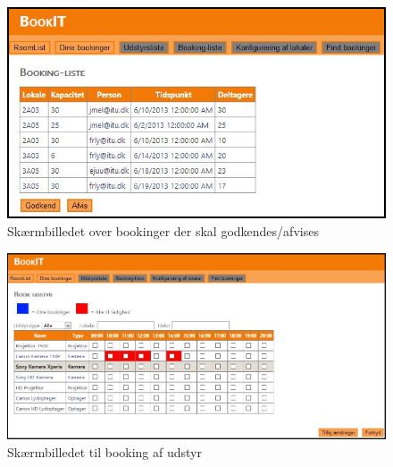 \begin{figure}[h!]
  \centering
    \includegraphics[width=\textwidth]{Appendix/GUI-Prototype/DigitalMockup/BookingListe}
  \caption{Skærmbilledet over bookinger der skal godkendes/afvises}
\label{App_GUI_final_BookingListe}
\end{figure}

\begin{figure}[h!]
  \centering
    \includegraphics[width=\textwidth]{Appendix/GUI-Prototype/DigitalMockup/BookEquip}
  \caption{Skærmbilledet til booking af udstyr}
\label{App_GUI_final_BookEquip}
\end{figure}

